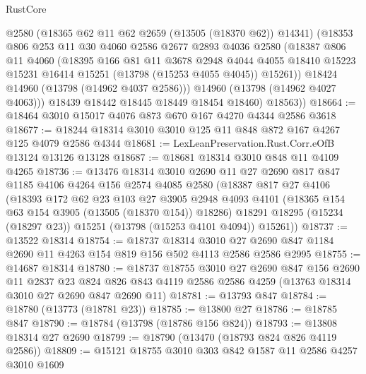 \begin{lexlean}{RustCore}
\begin{coremodule}
            @2580
            (@18365 @62 @11 @62 @2659 (@13505 (@18370 @62)) @14341)
            (@18353
              @806
              @253
              @11
              @30
              @4060
              @2586
              @2677
              @2893
              @4036
              @2580
              (@18387
                @806
                @11
                @4060
                (@18395
                  @166
                  @81
                  @11
                  @3678
                  @2948
                  @4044
                  @4055
                  @18410
                  @15223
                  @15231
                  @16414
                  @15251
                  (@13798 (@15253 @4055 @4045))
                  @15261))
              @18424
              @14960
              (@13798 (@14962 @4037 @2586)))
            @14960
            (@13798 (@14962 @4027 @4063)))
          @18439
          @18442
          @18445
          @18449
          @18454
          @18460)
        @18563))
@18664 := @18464 @3010 @15017 @4076 @873 @670 @167 @4270 @4344 @2586 @3618
@18677 := @18244 @18314 @3010 @3010 @125 @11 @848 @872 @167 @4267 @125 @4079 @2586 @4344
@18681 := LexLeanPreservation.Rust.Corr.eOfB @13124 @13126 @13128
@18687 := @18681 @18314 @3010 @848 @11 @4109 @4265
@18736 := @13476
    @18314
    @3010
    @2690
    @11
    @27
    @2690
    @817
    @847
    @1185
    @4106
    @4264
    @156
    @2574
    @4085
    @2580
    (@18387
      @817
      @27
      @4106
      (@18393
        @172
        @62
        @23
        @103
        @27
        @3905
        @2948
        @4093
        @4101
        (@18365 @154 @63 @154 @3905 (@13505 (@18370 @154)) @18286)
        @18291
        @18295
        (@15234 (@18297 @23))
        @15251
        (@13798 (@15253 @4101 @4094))
        @15261))
@18737 := @13522 @18314
@18754 := @18737
    @18314
    @3010
    @27
    @2690
    @847
    @1184
    @2690
    @11
    @4263
    @154
    @819
    @156
    @502
    @4113
    @2586
    @2586
    @2995
@18755 := @14687 @18314
@18780 := @18737
    @18755
    @3010
    @27
    @2690
    @847
    @156
    @2690
    @11
    @2837
    @23
    @824
    @826
    @843
    @4119
    @2586
    @2586
    @4259
    (@13763 @18314 @3010 @27 @2690 @847 @2690 @11)
@18781 := @13793 @847
@18784 := @18780 (@13773 (@18781 @23))
@18785 := @13800 @27
@18786 := @18785 @847
@18790 := @18784 (@13798 (@18786 @156 @824))
@18793 := @13808 @18314 @27 @2690
@18799 := @18790 (@13470 (@18793 @824 @826 @4119 @2586))
@18809 := @15121 @18755 @3010 @303 @842 @1587 @11 @2586 @4257 @3010 @1609

\end{coremodule}
\end{lexlean}
